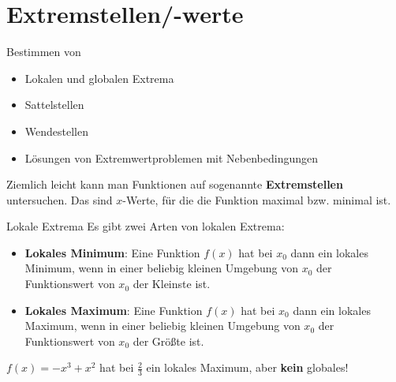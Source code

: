 \chapter{Extremstellen/-werte}
\begin{inhalt}
  Bestimmen von
  \begin{itemize}
    \item Lokalen und globalen Extrema
    \item Sattelstellen
    \item Wendestellen
    \item Lösungen von Extremwertproblemen mit Nebenbedingungen
  \end{itemize}
\end{inhalt}

Ziemlich leicht kann man Funktionen auf sogenannte \textbf{Extremstellen} untersuchen. Das sind $x$-Werte, für die die Funktion maximal bzw. minimal ist.
\begin{bla}{Lokale Extrema}
  Es gibt zwei Arten von lokalen Extrema:
  \begin{itemize}
    \item \textbf{Lokales Minimum}: Eine Funktion $f(x)$ hat bei $x_0$ dann ein lokales Minimum, wenn in einer beliebig kleinen Umgebung von $x_0$ der Funktionswert von $x_0$ der Kleinste ist.
    \item \textbf{Lokales Maximum}: Eine Funktion $f(x)$ hat bei $x_0$ dann ein lokales Maximum, wenn in einer beliebig kleinen Umgebung von $x_0$ der Funktionswert von $x_0$ der Größte ist.
  \end{itemize}

  \begin{marginfigure}[-14em]
    \caption{$f(x)=-x^3+x^2$ hat bei $\frac{2}{3}$ ein lokales Maximum, aber \textbf{kein} globales!}
  \end{marginfigure}
\end{bla}

